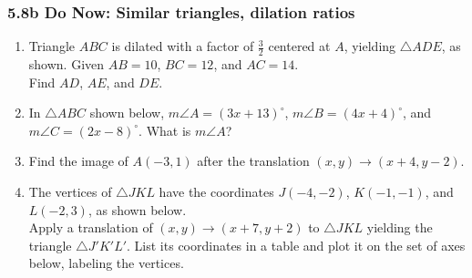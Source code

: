 \documentclass[12pt, twoside]{article}
\begin{document}
\subsubsection*{5.8b Do Now: Similar triangles, dilation ratios}
 \begin{enumerate}

  \item Triangle $ABC$ is dilated with a factor of $\frac{3}{2}$ centered at $A$, yielding $\triangle ADE$, as shown. Given $AB=10$, $BC=12$, and $AC=14$. \\[0.25cm] Find $AD$, $AE$, and $DE$.
    \begin{flushright}
      \end{flushright}

   \vspace{2cm}


   \item In  $\triangle ABC$ shown below, $m\angle A=(3x+13)^\circ$, $m\angle B=(4x+4)^\circ$, and $m\angle C=(2x-8)^\circ$. What is $m\angle A$?
   \begin{flushright}
     \end{flushright}

   \newpage
   \item Find the image of $A(-3,1)$ after the translation $(x,y) \rightarrow (x+4,y-2)$.
   \vspace{2cm}

    \item The vertices of $\triangle JKL$ have the coordinates $J(-4,-2)$, $K(-1,-1)$, and $L(-2,3)$, as shown below. \\[0.25cm]
    Apply a translation of $(x,y) \rightarrow (x+7, y+2)$ to $\triangle JKL$  yielding the triangle $\triangle J'K'L'$. List its coordinates in a table and plot it on the set of axes below, labeling the vertices.
    \begin{flushright}
\end{flushright}
\end{enumerate}
\end{document}
